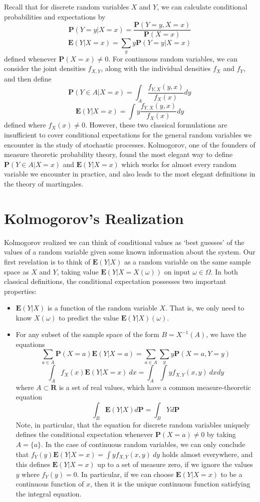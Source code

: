 Recall that for discrete random variables $X$ and $Y$, we can calculate conditional probabilities and expectations by
%
\[ \mathbf{P}(Y = y | X = x) = \frac{\mathbf{P}(Y = y, X = x)}{\mathbf{P}(X = x)} \]
\[ \mathbf{E}(Y|X = x) = \sum_y y \mathbf{P}(Y = y|X=x) \]
%
defined whenever $\mathbf{P}(X = x) \neq 0$. For continuous random variables, we can consider the joint densities $f_{X,Y}$, along with the individual densities $f_X$ and $f_Y$, and then define
%
\[ \mathbf{P}(Y \in A | X = x) = \int_A \frac{f_{Y,X}(y,x)}{f_X(x)} dy \]
\[ \mathbf{E}(Y|X = x) = \int y \frac{f_{Y,X}(y,x)}{f_X(x)} dy \]
%
defined where $f_X(x) \neq 0$. However, these two classical formulations are insufficient to cover conditional expectations for the general random variables we encounter in the study of stochastic processes. Kolmogorov, one of the founders of measure theoretic probability theory, found the most elegant way to define $\mathbf{P}(Y \in A | X = x)$ and $\mathbf{E}(Y|X=x)$ which works for almost every random variable we encounter in practice, and also leads to the most elegant definitions in the theory of martingales.

\section{Kolmogorov's Realization}

Kolmogorov realized we can think of conditional values as `best guesses' of the values of a random variable given some known information about the system. Our first revelation is to think of $\mathbf{E}(Y|X)$ as a random variable on the same sample space as $X$ and $Y$, taking value $\mathbf{E}(Y|X=X(\omega))$ on input $\omega \in \Omega$. In both classical definitions, the conditional expectation possesses two important properties:
%
\begin{itemize}
    \item $\mathbf{E}(Y|X)$ is a function of the random variable $X$. That is, we only need to know $X(\omega)$ to predict the value $\mathbf{E}(Y|X)(\omega)$.

    \item For any subset of the sample space of the form $B = X^{-1}(A)$, we have the equations
    \[ \sum_{a \in A} \mathbf{P}(X = a) \mathbf{E}(Y|X = a) = \sum_{a \in A} \sum_y y \mathbf{P}(X = a, Y = y) \]
    \[ \int_A f_X(x) \mathbf{E}(Y|X=x)\ dx = \int_A \int y f_{X,Y}(x,y)\ dx dy \]
    where $A \subset \mathbf{R}$ is a set of real values, which have a common measure-theoretic equation
    \[ \int_B \mathbf{E}(Y|X) d\mathbf{P} = \int_B Y d\mathbf{P} \]
    Note, in particular, that the equation for discrete random variables uniquely defines the conditional expectation whenever $\mathbf{P}(X = a) \neq 0$ by taking $A = \{ a \}$. In the case of continuous random variables, we can only conclude that $f_Y(y) \mathbf{E}(Y|X=x) = \int y f_{X,Y}(x,y)\ dy$ holds almost everywhere, and this defines $\mathbf{E}(Y|X=x)$ up to a set of measure zero, if we ignore the values $y$ where $f_Y(y) = 0$. In particular, if we can choose $\mathbf{E}(Y|X=x)$ to be a continuous function of $x$, then it is the unique continuous function satisfying the integral equation.
\end{itemize}


